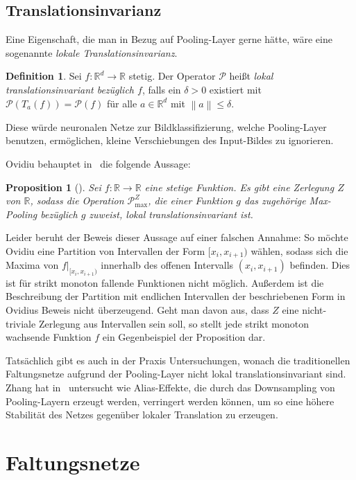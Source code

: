 \documentclass[paper=a4, 	%
		fontsize=11pt,
		abstract=true, 	%
		headsepline, 	%
		notitlepage	%
		]{scrartcl}
\newtheorem{proposition}[theorem]{Proposition}
\theoremstyle{definition}
\newtheorem{definition}[theorem]{Definition}
\newcommand{\R}{\mathbb{R}}
\newcommand{\norm}[1]{\left\lVert#1\right\rVert}
\begin{document}
\subsection{Translationsinvarianz}

Eine Eigenschaft, die man in Bezug auf Pooling-Layer gerne hätte, wäre eine sogenannte \emph{lokale Translationsinvarianz}.
\begin{definition}
    Sei $f: \R^d \rightarrow \R$ stetig.
    Der Operator $\mathcal{P}$ heißt \emph{lokal translationsinvariant bezüglich $f$}, falls ein $\delta > 0$ existiert mit $\mathcal{P} ( T_a ( f ) ) = \mathcal{P} ( f )$ für alle $a\in\R^d$ mit $\norm{a} \leq \delta$.
\end{definition}

Diese würde neuronalen Netze zur Bildklassifizierung, welche Pooling-Layer benutzen, ermöglichen, kleine Verschiebungen des Input-Bildes zu ignorieren.

Ovidiu behauptet in~\cite[Proposition~15.2.1]{Calin2020} die folgende Aussage:
\begin{proposition}[{\cite[Proposition~15.2.1]{Calin2020}}]
    Sei $f: \R \rightarrow \R$ eine stetige Funktion.
    Es gibt eine Zerlegung $Z$ von $\R$, sodass die Operation $\mathcal{P}^Z_{\max}$, die einer Funktion $g$ das zugehörige Max-Pooling bezüglich $g$ zuweist, lokal translationsinvariant ist.
\end{proposition}

Leider beruht der Beweis dieser Aussage auf einer falschen Annahme:
So möchte Ovidiu eine Partition von Intervallen der Form $[x_i, x_{i+1})$ wählen, sodass sich die Maxima von ${f}\vert_{[x_i, x_{i+1})}$ innerhalb des offenen Intervalls $(x_i, x_{i+1})$ befinden.
Dies ist für strikt monoton fallende Funktionen nicht möglich.
Außerdem ist die Beschreibung der Partition mit endlichen Intervallen der beschriebenen Form in Ovidius Beweis nicht überzeugend.
Geht man davon aus, dass $Z$ eine nicht-triviale Zerlegung aus Intervallen sein soll, so stellt jede strikt monoton wachsende Funktion $f$ ein Gegenbeispiel der Proposition dar.

Tatsächlich gibt es auch in der Praxis Untersuchungen, wonach die traditionellen Faltungsnetze aufgrund der Pooling-Layer nicht lokal translationsinvariant sind.
Zhang hat in~\cite{zhang2019shiftinvar} untersucht wie Alias-Effekte, die durch das Downsampling von Pooling-Layern erzeugt werden, verringert werden können, um so eine höhere Stabilität des Netzes gegenüber lokaler Translation zu erzeugen.


\section{Faltungsnetze}


\clearpage          %
\thispagestyle{empty}

\end{document}
